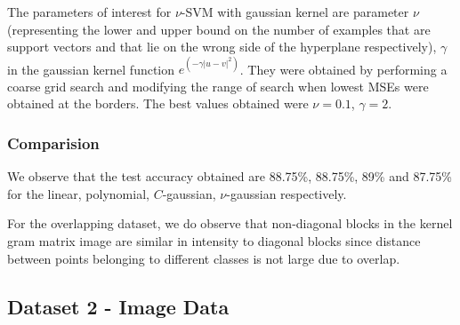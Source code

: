 \documentclass{article}
\begin{document}
The parameters of interest for $\nu$-SVM with gaussian kernel are parameter $\nu$(representing the lower and upper bound on the number of examples that are support vectors and that lie on the wrong side of the hyperplane respectively), $\gamma$ in the gaussian kernel function $e^{(-\gamma|u-v|^{2})}$. They were obtained by performing a coarse grid search and modifying the range of search when lowest MSEs were obtained at the borders.
The best values obtained were $\nu=0.1$, $\gamma=2$.

\subsubsection{Comparision}
We observe that the test accuracy obtained are 88.75\%, 88.75\%, 89\% and 87.75\% for the linear, polynomial, $C$-gaussian, $\nu$-gaussian respectively. 

For the overlapping dataset, we do observe that non-diagonal blocks in the kernel gram matrix image are similar in intensity to diagonal blocks since distance between points belonging to different classes is not large due to overlap.

\subsection{Dataset 2 - Image Data}
\end{document}
